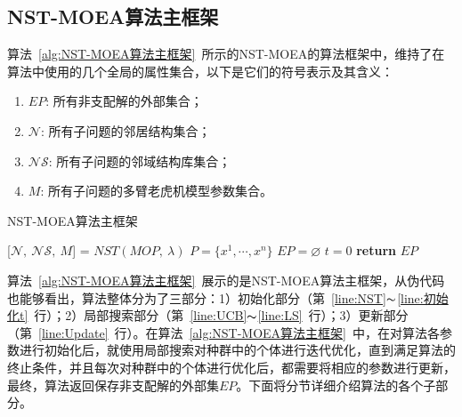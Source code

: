 \subsection{NST-MOEA算法主框架}
\label{subsec:NST:算法设计:NST-MOEA算法主框架}
算法~\ref{alg:NST-MOEA算法主框架}~所示的NST-MOEA的算法框架中，维持了在算法中使用的几个全局的属性集合，以下是它们的符号表示及其含义：
\begin{enumerate}
    \item $EP$: 所有非支配解的外部集合；
    \item $\mathcal{N}$: 所有子问题的邻居结构集合；
    \item $\mathcal{NS}$: 所有子问题的邻域结构库集合；
    \item $M$: 所有子问题的多臂老虎机模型参数集合。
\end{enumerate}
\begin{algorithm}
    \caption{NST-MOEA算法主框架}
    \label{alg:NST-MOEA算法主框架}
    \BlankLine
    [$\mathcal{N}, \ \mathcal{NS}, \ M$] = $NST(MOP, \ \lambda)$ \label{line:NST} \;
    $P = \{x^1, \cdots, x^n\}$ \label{line:初始化P} \;
    $EP = \varnothing$  \label{line:初始化EP}\;
    $t = 0$ \label{line:初始化t} \;
    \textbf{return } $EP$ \;
\end{algorithm}
\vspace{-1em}
算法~\ref{alg:NST-MOEA算法主框架}~展示的是NST-MOEA算法主框架，从伪代码也能够看出，算法整体分为了三部分：1）初始化部分（第~\ref{line:NST}$\thicksim$\ref{line:初始化t}~行）；2）局部搜索部分（第~\ref{line:UCB}$\thicksim$\ref{line:LS}~行）；3）更新部分（第~\ref{line:Update}~行）。在算法~\ref{alg:NST-MOEA算法主框架}~中，在对算法各参数进行初始化后，就使用局部搜索对种群中的个体进行迭代优化，直到满足算法的终止条件，并且每次对种群中的个体进行优化后，都需要将相应的参数进行更新，最终，算法返回保存非支配解的外部集$EP$。下面将分节详细介绍算法的各个子部分。

